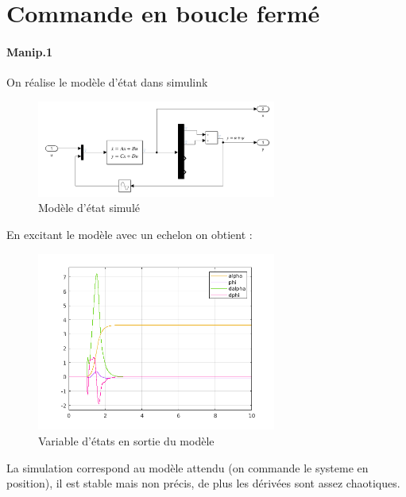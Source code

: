\documentclass[10pt,a4paper,notitlepage]{article}
\begin{document}
\section{Commande en boucle fermé}
\paragraph{Manip.1}
On réalise le modèle d'état dans simulink
\begin{figure}[ht]
  \centering
  \includegraphics[width=0.7\textwidth]{modeleNL_schema.png}
  \caption{Modèle d'état simulé}
  \label{fig:label}
\end{figure}
En excitant le modèle avec un echelon on obtient :
\begin{figure}[ht]
  \centering
  \includegraphics[width=0.7\textwidth]{modeleNL.png}
  \caption{Variable d'états en sortie du modèle}
  \label{fig:label}
\end{figure}
La simulation correspond au modèle attendu (on commande le systeme en position), il est stable mais non précis, de plus les dérivées sont assez chaotiques. 
\end{document}
